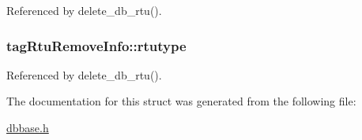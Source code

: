 Referenced by delete\-\_\-db\-\_\-rtu().

\hypertarget{structtagRtuRemoveInfo_abbc90c436c58b5aff022f9351e00d60c}{
\subsubsection[{rtutype}]{ tag\-Rtu\-Remove\-Info\-::rtutype}}\label{structtagRtuRemoveInfo_abbc90c436c58b5aff022f9351e00d60c}


Referenced by delete\-\_\-db\-\_\-rtu().



The documentation for this struct was generated from the following file\-:\begin{DoxyCompactItemize}
\item 
\hyperlink{dbbase_8h}{dbbase.\-h}\end{DoxyCompactItemize}
